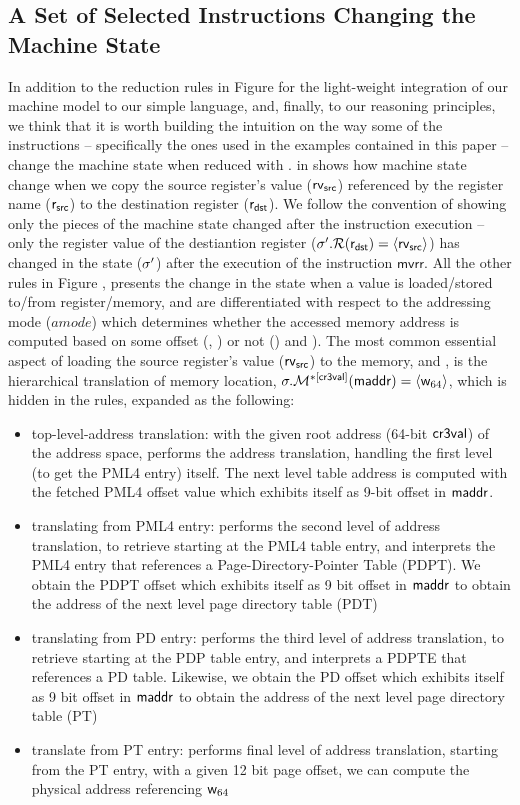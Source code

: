 \subsection{A Set of Selected Instructions Changing the Machine State}
\label{sec:selectedinstrsemantics}
In addition to the reduction rules in Figure  for the light-weight integration of our machine model to our simple language, and, finally, to our reasoning principles, we think that it is worth building the intuition on the way some of the instructions -- specifically the ones used in the examples contained in this paper -- change the machine state when reduced with .  in  shows how machine state change when we copy the source register's value ($\mathsf{rv}_{\textsf{src}}$) referenced by the register name ($\mathsf{r}_{\textsf{src}}$) to the destination register ($\mathsf{r}_{\textsf{dst}}$). We follow the convention of showing only the pieces of the machine state changed after the instruction execution -- only the register value of the destiantion register ($ \sigma'.\mathcal{R}(\mathsf{r}_{\textsf{dst}})=\langle\mathsf{rv}_{\textsf{src}}\rangle$) has changed in the state ($\sigma'$) after the execution of the instruction $\textsf{mvrr}$. All the other rules in Figure , presents the change in the state when a value is loaded/stored to/from register/memory, and are differentiated with respect to the addressing mode ($amode$) which determines whether the accessed memory address is computed based on some offset (, ) or not () and ). The most common essential aspect of loading the source register's value ($\mathsf{rv}_{\textsf{src}}$) to the memory,  and , is the hierarchical translation of memory location, $\sigma.\mathcal{M}^{*[\mathsf{cr3val}]}(\mathsf{maddr})=\langle\mathsf{w}_{64}\rangle$, which is hidden in the rules, expanded as the following:
\begin{itemize}
\item top-level-address translation: with the given root address (64-bit $\mathsf{cr3val}$) of the address space, performs the address translation, handling the first level (to get the PML4 entry) itself. The next level table address is computed with the fetched PML4 offset value which exhibits itself as 9-bit offset in $\mathsf{maddr}$.
\item translating from PML4 entry: performs the second level of address translation, to retrieve starting at the PML4 table entry, and interprets the PML4 entry that references a Page-Directory-Pointer Table (PDPT). We obtain the PDPT offset which exhibits itself as 9 bit offset in $\mathsf{maddr}$ to obtain the address of the next level page directory table (PDT)
\item translating from PD entry: performs the third level of address translation, to retrieve starting at the PDP table entry, and interprets a PDPTE that references a PD table. Likewise, we obtain the PD offset which exhibits itself as 9 bit offset in $\mathsf{maddr}$ to obtain the address of the next level page directory table (PT)
\item translate from PT entry: performs final level of address translation, starting from the PT entry, with a given 12 bit page offset, we can compute the physical address referencing $\mathsf{w}_{64}$
\end{itemize}
